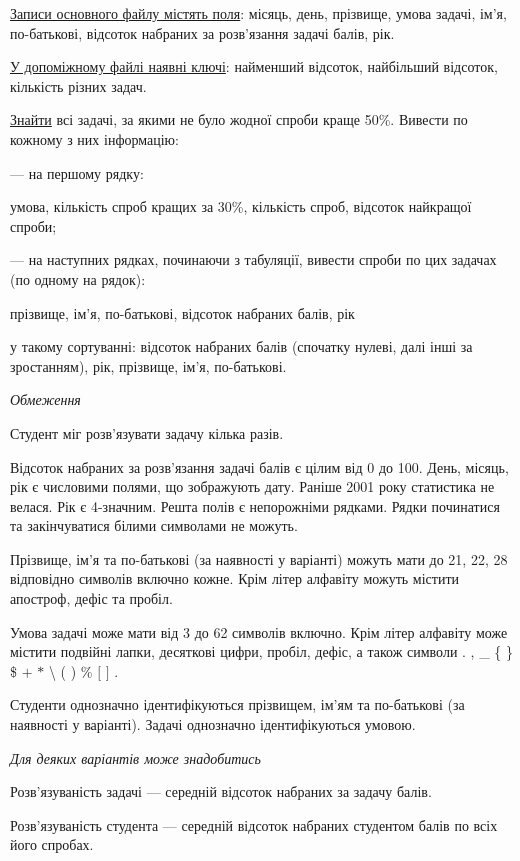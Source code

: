 \documentclass[11pt, ukrainian]{article}
\begin{document}
\underline{Записи основного файлу містять поля}: місяць, день, прізвище, умова задачі, ім’я, по-батькові, відсоток набраних за розв’язання задачі балів, рік.

\underline{У допоміжному файлі наявні ключі}: найменший відсоток, найбільший відсоток, кількість різних задач.

\underline{Знайти} всі задачі, за якими не було жодної спроби краще 50\%. Вивести по кожному з них інформацію:\par
{\noindent}--- на першому рядку:\par
умова, кількість спроб кращих за 30\%, кількість спроб, відсоток найкращої спроби;

{\noindent}--- на наступних рядках, починаючи з табуляції, вивести спроби по цих задачах (по одному на рядок):\par
прізвище, ім’я, по-батькові, відсоток набраних балів, рік

{\noindent}у такому сортуванні: відсоток набраних балів (спочатку нулеві, далі інші за зростанням), рік, прізвище, ім’я, по-батькові.


\bigskip\textit{Обмеження}

Студент міг розв’язувати задачу кілька разів.

Відсоток набраних за розв’язання задачі балів є цілим від 0 до 100.
День, місяць, рік є числовими полями, що зображують дату.
Раніше 2001 року статистика не велася. Рік є 4-значним.
Решта полів є непорожніми рядками.
Рядки починатися та закінчуватися білими символами не можуть.

Прізвище, ім’я та по-батькові (за наявності у варіанті) можуть мати до 21, 22, 28 відповідно символів включно кожне. 
Крім літер алфавіту можуть містити апостроф, дефіс та пробіл.

Умова задачі може мати від 3 до 62 символів включно.
Крім літер алфавіту може містити подвійні лапки, десяткові цифри, пробіл, дефіс,
а також символи . , \_ \{ \} \$ $+$ $*$ {\textbackslash} ( ) \% $[$ $]$ .

Студенти однозначно ідентифікуються прізвищем, ім’ям та по-батькові (за наявності у варіанті).
Задачі однозначно ідентифікуються умовою.

\bigskip\textit{Для деяких варіантів може знадобитись}

Розв'язуваність задачі --- середній відсоток набраних за задачу балів.

Розв'язуваність студента --- середній відсоток набраних студентом балів по всіх його спробах.
\end{document}
